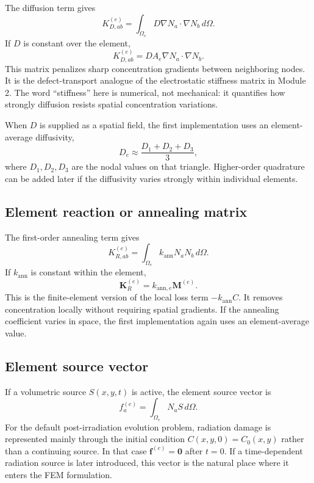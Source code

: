 \documentclass[11pt]{article}
\begin{document}
The diffusion term gives
\begin{equation}
K_{D,ab}^{(e)}=\int_{\Omega_e}D\nabla N_a\cdot\nabla N_b\,d\Omega.
\end{equation}
If $D$ is constant over the element,
\begin{equation}
K_{D,ab}^{(e)}=D A_e\nabla N_a\cdot\nabla N_b.
\end{equation}
This matrix penalizes sharp concentration gradients between neighboring nodes. It is the defect-transport analogue of the electrostatic stiffness matrix in Module 2. The word ``stiffness'' here is numerical, not mechanical: it quantifies how strongly diffusion resists spatial concentration variations.

When $D$ is supplied as a spatial field, the first implementation uses an element-average diffusivity,
\begin{equation}
D_e \approx \frac{D_1+D_2+D_3}{3},
\end{equation}
where $D_1,D_2,D_3$ are the nodal values on that triangle. Higher-order quadrature can be added later if the diffusivity varies strongly within individual elements.

\subsection{Element reaction or annealing matrix}

The first-order annealing term gives
\begin{equation}
K_{R,ab}^{(e)}=\int_{\Omega_e}k_{\mathrm{ann}}N_aN_b\,d\Omega.
\end{equation}
If $k_{\mathrm{ann}}$ is constant within the element,
\begin{equation}
\bm{K}_{R}^{(e)}=k_{\mathrm{ann},e}\bm{M}^{(e)}.
\end{equation}
This is the finite-element version of the local loss term $-k_{\mathrm{ann}}C$. It removes concentration locally without requiring spatial gradients. If the annealing coefficient varies in space, the first implementation again uses an element-average value.

\subsection{Element source vector}

If a volumetric source $S(x,y,t)$ is active, the element source vector is
\begin{equation}
f_a^{(e)}=\int_{\Omega_e}N_aS\,d\Omega.
\end{equation}
For the default post-irradiation evolution problem, radiation damage is represented mainly through the initial condition $C(x,y,0)=C_0(x,y)$ rather than a continuing source. In that case $\bm{f}^{(e)}=\bm{0}$ after $t=0$. If a time-dependent radiation source is later introduced, this vector is the natural place where it enters the FEM formulation.
\end{document}
